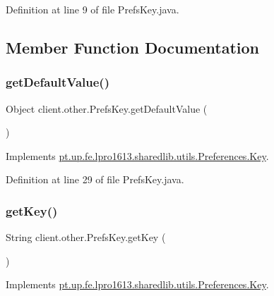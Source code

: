Definition at line 9 of file Prefs\+Key.\+java.



\subsection{Member Function Documentation}
\hypertarget{enumclient_1_1other_1_1_prefs_key_a7d50bec7ffef68ca2b9657cc4a8b271f}{}\label{enumclient_1_1other_1_1_prefs_key_a7d50bec7ffef68ca2b9657cc4a8b271f} 
\subsubsection{\texorpdfstring{get\+Default\+Value()}{getDefaultValue()}}
{\footnotesize\ttfamily Object client.\+other.\+Prefs\+Key.\+get\+Default\+Value (\begin{DoxyParamCaption}{ }\end{DoxyParamCaption})}



Implements \hyperlink{interfacept_1_1up_1_1fe_1_1lpro1613_1_1sharedlib_1_1utils_1_1_preferences_1_1_key_aa78c759626a4e04578befd149e4c7310}{pt.\+up.\+fe.\+lpro1613.\+sharedlib.\+utils.\+Preferences.\+Key}.



Definition at line 29 of file Prefs\+Key.\+java.

\hypertarget{enumclient_1_1other_1_1_prefs_key_a204beaf7ef2607c5ee052bf712d5fc66}{}\label{enumclient_1_1other_1_1_prefs_key_a204beaf7ef2607c5ee052bf712d5fc66} 
\subsubsection{\texorpdfstring{get\+Key()}{getKey()}}
{\footnotesize\ttfamily String client.\+other.\+Prefs\+Key.\+get\+Key (\begin{DoxyParamCaption}{ }\end{DoxyParamCaption})}



Implements \hyperlink{interfacept_1_1up_1_1fe_1_1lpro1613_1_1sharedlib_1_1utils_1_1_preferences_1_1_key_af244cecb8edad1f87eaaa517c3590507}{pt.\+up.\+fe.\+lpro1613.\+sharedlib.\+utils.\+Preferences.\+Key}.



